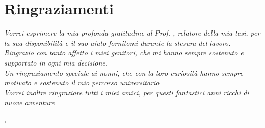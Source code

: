 \cleardoublepage
{}
{}



\bigskip

\begingroup
\let\clearpage\relax
\let\cleardoublepage\relax
\let\cleardoublepage\relax

\chapter*{Ringraziamenti}

\noindent \textit{Vorrei esprimere la mia profonda gratitudine al Prof. \myProf, relatore della mia tesi, per la sua disponibilità e il suo aiuto fornitomi durante la stesura del lavoro.}\\

\noindent \textit{Ringrazio con tanto affetto i miei genitori, che mi hanno sempre sostenuto e supportato in ogni mia decisione.}\\

\noindent \textit{Un ringraziamento speciale ai nonni, che con la loro curiosità hanno sempre motivato e sostenuto il mio percorso universitario}\\

\noindent \textit{Vorrei inoltre ringraziare tutti i miei amici, per questi fantastici anni ricchi di nuove avventure}\\
\bigskip

\noindent\textit{\myLocation, \myTime}
\hfill \myName

\endgroup
